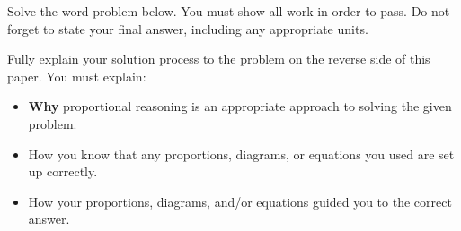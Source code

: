 
Solve the word problem below. You must show all work in order to pass. Do not forget to state your final answer, including any appropriate units.

\begin{statement}
\end{statement}

\begin{ansenv}
    \vspace{12pt}
\end{ansenv}

\newpage
{}

Fully explain your solution process to the problem on the reverse side of this paper. You must explain:
\begin{itemize}
    \item \textbf{Why} proportional reasoning is an appropriate approach to solving the given problem.
    \item How you know that any proportions, diagrams, or equations you used are set up correctly.
    \item How your proportions, diagrams, and/or equations guided you to the correct answer.
\end{itemize}